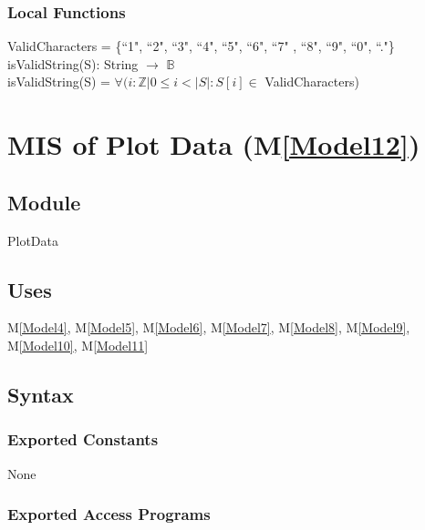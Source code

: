 \documentclass[12pt, titlepage]{article}
\newcommand{\mref}[1]{M\ref{#1}}
\begin{document}
\subsubsection{Local Functions}
ValidCharacters = \{``1", ``2", ``3", ``4", ``5", ``6", ``7"
, ``8", ``9", ``0", ``."\}\\

\noindent isValidString(S): String $\rightarrow$ $\mathbb{B}$ \\

\noindent isValidString(S) = $\forall(i : \mathbb{Z} | 0 \leq
i < |S| : S[i] \in $ ValidCharacters)

\newpage

\section{MIS of Plot Data (\mref{Model12})}

\subsection{Module}
PlotData

\subsection{Uses}
\mref{Model4}, \mref{Model5}, \mref{Model6}, \mref{Model7},
\mref{Model8}, \mref{Model9}, \mref{Model10}, \mref{Model11}    

\subsection{Syntax}
\subsubsection{Exported Constants}
None
\subsubsection{Exported Access Programs}
\end{document}
